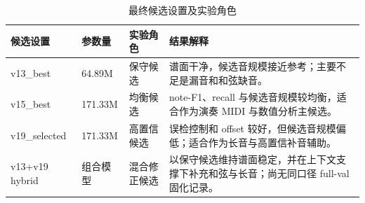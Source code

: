 \begin{table}[H]
\centering
\caption{最终候选设置及实验角色}
\label{tab:version_comparison}
\begin{tabularx}{\textwidth}{l l l X}
\toprule
候选设置 & 参数量 & 实验角色 & 结果解释 \\
\midrule
v13\_best & 64.89M & 保守候选 & 谱面干净，候选音规模接近参考；主要不足是漏音和和弦缺音。 \\
v15\_best & 171.33M & 均衡候选 & note-F1、recall 与候选音规模较均衡，适合作为演奏 MIDI 与数值分析主候选。 \\
v19\_selected & 171.33M & 高置信候选 & 误检控制和 offset 较好，但候选音规模偏低；适合作为长音与高置信补音辅助。 \\
v13+v19 hybrid & 组合模型 & 混合修正候选 & 以保守候选维持谱面稳定，并在上下文支撑下补充和弦与长音；尚无同口径 full-val 固化记录。 \\
\bottomrule
\end{tabularx}
\end{table}
